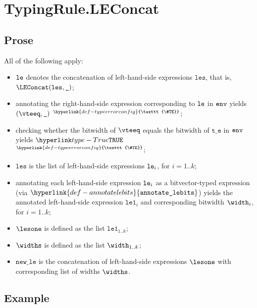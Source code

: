 \documentclass{book}
\newcommand\TypeErrorConfig[0]{\hyperlink{def-typeerrorconfig}{\texttt{\#TE}}}
\newcommand\ProseOrTypeError[0]{\hyperlink{def-proseortypeerror}{$^{\TypeErrorConfig}$}}
\newcommand\annotatelebits[0]{\hyperlink{def-annotatelebits}{\texttt{annotate\_lebits}}}
\newcommand\vte[0]{\texttt{t\_e}}
\newcommand\vleone[0]{\texttt{le1}}
\newcommand\newle[0]{\texttt{new\_le}}
\newcommand\les[0]{\texttt{les}}
\begin{document}

\section{TypingRule.LEConcat \label{sec:TypingRule.LEConcat}}

\subsection{Prose}
All of the following apply:
\begin{itemize}
  \item $\texttt{le}$ denotes the concatenation of left-hand-side expressions $\les$, that is, \\ $\LEConcat(\les, \Ignore)$;
  \item annotating the right-hand-side expression corresponding to $\texttt{le}$ in $\texttt{env}$ yields \\ $(\vteeq, \Ignore)$ \ProseOrTypeError;
  \item checking whether the bitwidth of $\vteeq$ equals the bitwidth of $\vte$ in $\texttt{env}$ yields $\True$ \ProseOrTypeError;
  \item $\les$ is the list of left-hand-side expressions $\texttt{le}_i$, for $i=1..k$;
  \item annotating each left-hand-side expression $\texttt{le}_i$ as a bitvector-typed expression (via $\annotatelebits$)
        yields the annotated left-hand-side expression $\vleone_i$ and corresponding bitwidth $\width_i$, for $i=1..k$;
  \item $\lesone$ is defined as the list $\vleone_{1..k}$;
  \item $\widths$ is defined as the list $\width_{1..k}$;
  \item $\newle$ is the concatenation of left-hand-side expressions $\lesone$ with corresponding list of widths $\widths$.
\end{itemize}

\subsection{Example}

\end{document}

